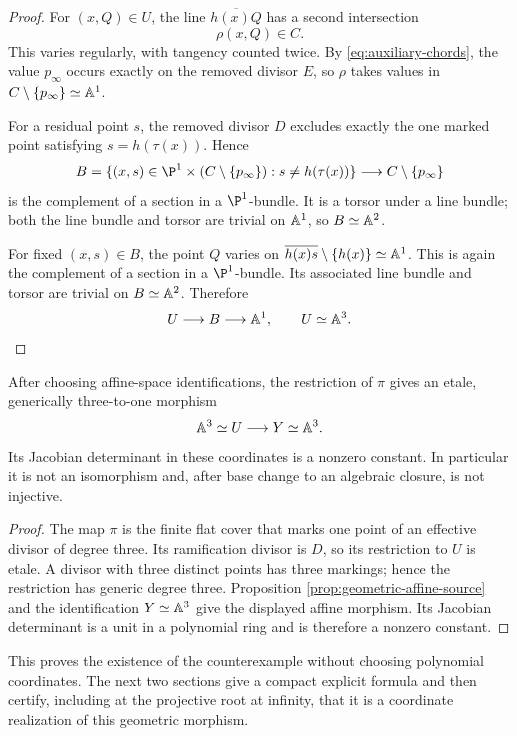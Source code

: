 \begin{proof}
For $(x,Q)\in U$, the line $\overline{h(x)Q}$ has a second intersection
\[
 \rho(x,Q)\in C.
\]
This varies regularly, with tangency counted twice.  By
\eqref{eq:auxiliary-chords}, the value $p_\infty$ occurs exactly on the
removed divisor $E$, so $\rho$ takes values in
$C\setminus\{p_\infty\}\simeq\mathbb A^1$.

For a residual point $s$, the removed divisor $D$ excludes exactly the one
marked point satisfying $s=h(\tau(x))$.  Hence
\[
 B=\{(x,s)\in\P^1\times(C\setminus\{p_\infty\}):
          s\ne h(\tau(x))\}
\longrightarrow C\setminus\{p_\infty\}
\]
is the complement of a section in a $\P^1$-bundle.  It is a torsor under a
line bundle; both the line bundle and torsor are trivial on $\mathbb A^1$, so
$B\simeq\mathbb A^2$.

For fixed $(x,s)\in B$, the point $Q$ varies on
$\overline{h(x)s}\setminus\{h(x)\}\simeq\mathbb A^1$.  This is again the
complement of a section in a $\P^1$-bundle.  Its associated line bundle and
torsor are trivial on $B\simeq\mathbb A^2$.  Therefore
\[
 U\longrightarrow B\longrightarrow\mathbb A^1,
 \qquad U\simeq\mathbb A^3.\qedhere
\]
\end{proof}

\begin{theorem}\label{thm:geometric-counterexample}
After choosing affine-space identifications, the restriction of $\pi$ gives
an etale, generically three-to-one morphism
\[
 \mathbb A^3\simeq U\longrightarrow Y\simeq\mathbb A^3.
\]
Its Jacobian determinant in these coordinates is a nonzero constant.  In
particular it is not an isomorphism and, after base change to an algebraic
closure, is not injective.
\end{theorem}

\begin{proof}
The map $\pi$ is the finite flat cover that marks one point of an effective
divisor of degree three.  Its ramification divisor is $D$, so its restriction
to $U$ is etale.  A divisor with three distinct points has three markings;
hence the restriction has generic degree three.  Proposition
\ref{prop:geometric-affine-source} and the identification $Y\simeq\mathbb A^3$
give the displayed affine morphism.  Its Jacobian determinant is a unit in a
polynomial ring and is therefore a nonzero constant.
\end{proof}

This proves the existence of the counterexample without choosing polynomial
coordinates.  The next two sections give a compact explicit formula and then
certify, including at the projective root at infinity, that it is a coordinate
realization of this geometric morphism.
